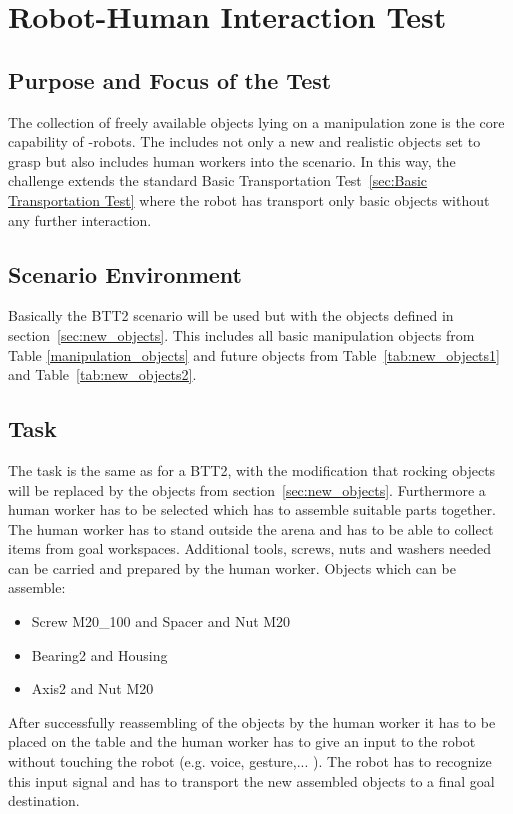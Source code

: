 \newpage
\section{Robot-Human Interaction Test}

\subsection{Purpose and Focus of the Test}
The collection of freely available objects lying on a manipulation zone is the core capability of \RCAW-robots. The  includes not only a new and realistic objects set to grasp but also includes human workers into the scenario. In this way, the challenge extends the standard Basic Transportation Test~\ref{sec:Basic Transportation Test} where the robot has transport only basic objects without any further interaction. 

\subsection{Scenario Environment}
Basically the BTT2 scenario will be used but with the objects defined in section~\ref{sec:new_objects}. This includes all basic manipulation objects from Table \ref{manipulation_objects} and future objects from Table~\ref{tab:new_objects1} and Table~\ref{tab:new_objects2}.

\subsection{Task}
The task is the same as for a BTT2, with the modification that rocking objects will be replaced by the objects from section~\ref{sec:new_objects}. Furthermore a human worker has to be selected which has to assemble suitable parts together. The human worker has to stand outside the arena and has to be able to collect items from goal workspaces. Additional tools, screws, nuts and washers needed can be carried and prepared by the human worker.
Objects which can be assemble: 
\begin{itemize}
	\item Screw M20\_100 and Spacer and Nut M20
	\item Bearing2 and  Housing
	\item Axis2 and Nut M20  
\end{itemize}

After successfully reassembling of the objects by the human worker it has to be placed on the table and the human worker has to give an input to the robot without touching the robot (e.g. voice, gesture,... ). The robot has to recognize this input signal and has to transport the new assembled objects to a final goal destination. 

